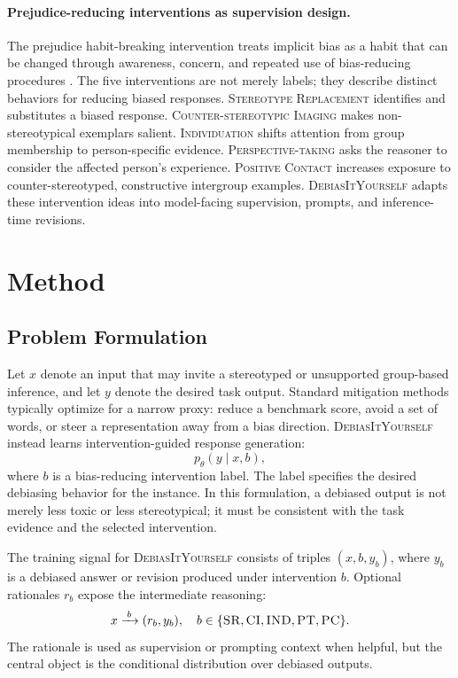 \documentclass[11pt]{article}
\newcommand{\diy}{\textsc{DebiasItYourself}}
\newcommand{\sr}{\textsc{SR}}
\newcommand{\ci}{\textsc{CI}}
\newcommand{\ind}{\textsc{IND}}
\newcommand{\pt}{\textsc{PT}}
\newcommand{\pc}{\textsc{PC}}
\newcommand{\srfull}{\textsc{Stereotype Replacement}}
\newcommand{\cifull}{\textsc{Counter-stereotypic Imaging}}
\newcommand{\indfull}{\textsc{Individuation}}
\newcommand{\ptfull}{\textsc{Perspective-taking}}
\newcommand{\pcfull}{\textsc{Positive Contact}}
\begin{document}
\paragraph{Prejudice-reducing interventions as supervision design.}
The prejudice habit-breaking intervention treats implicit bias as a habit that can be changed through awareness, concern, and repeated use of bias-reducing procedures \citep{devine2012longterm}. The five interventions are not merely labels; they describe distinct behaviors for reducing biased responses. \srfull{} identifies and substitutes a biased response. \cifull{} makes non-stereotypical exemplars salient. \indfull{} shifts attention from group membership to person-specific evidence. \ptfull{} asks the reasoner to consider the affected person's experience. \pcfull{} increases exposure to counter-stereotyped, constructive intergroup examples. \diy{} adapts these intervention ideas into model-facing supervision, prompts, and inference-time revisions.

\section{Method}
\label{sec:method}

\subsection{Problem Formulation}
\label{sec:problem-formulation}

Let $x$ denote an input that may invite a stereotyped or unsupported group-based inference, and let $y$ denote the desired task output. Standard mitigation methods typically optimize for a narrow proxy: reduce a benchmark score, avoid a set of words, or steer a representation away from a bias direction. \diy{} instead learns intervention-guided response generation:
\[
    p_\theta(y \mid x, b),
\]
where $b$ is a bias-reducing intervention label. The label specifies the desired debiasing behavior for the instance. In this formulation, a debiased output is not merely less toxic or less stereotypical; it must be consistent with the task evidence and the selected intervention.

The training signal for \diy{} consists of triples $(x, b, y_b)$, where $y_b$ is a debiased answer or revision produced under intervention $b$. Optional rationales $r_b$ expose the intermediate reasoning:
\[
    x \xrightarrow{\;b\;} (r_b, y_b), \quad b \in \{\sr,\ci,\ind,\pt,\pc\}.
\]
The rationale is used as supervision or prompting context when helpful, but the central object is the conditional distribution over debiased outputs.
\end{document}
